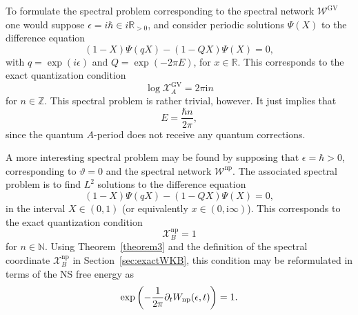 \documentclass[pdftex]{sigma}
\numberwithin{equation}{section}
\begin{document}
To formulate the spectral problem corresponding to the spectral network $\mathcal{W}^\mathrm{GV}$ one would suppose $\epsilon = i \hbar \in i \mathbb{R}_{>0}$, and consider periodic solutions $\Psi(X)$ to the difference equation
\begin{equation*}
 (1-X) \Psi(q X) - (1 - Q X) \Psi(X) =0,
\end{equation*}
with $q = \exp (i \epsilon)$ and $Q = \exp (-2 \pi E)$, for $x \in \mathbb{R}$. This corresponds to the exact quantization condition
\begin{equation*}
 \log \mathcal{X}_A^\mathrm{GV} = 2 \pi \mathrm{i} n
\end{equation*}
for $n \in \mathbb{Z}$. This spectral problem is rather trivial, however. It just implies that
\begin{equation*}
E = \frac{\hbar n}{2\pi},
\end{equation*}
since the quantum $A$-period does not receive any quantum corrections.

A more interesting spectral problem may be found by supposing that $\epsilon = \hbar >0$, corresponding to $\vartheta = 0$ and the spectral network $\mathcal{W}^\mathrm{np}$. The associated spectral problem is to find $L^2$ solutions to the difference equation
\begin{equation*}
 (1-X) \Psi(q X) - (1 - Q X) \Psi(X) =0,
\end{equation*}
in the interval $X \in (0,1)$ (or equivalently $x \in (0,\mathrm{i} \infty)$).
This corresponds to the exact quantization condition
\begin{equation*}
 \mathcal{X}_B^\mathrm{np} = 1
\end{equation*}
for $n \in \mathbb{N}$. Using Theorem~\ref{theorem3} and the definition of the spectral coordinate $\mathcal{X}_B^\mathrm{np}$ in Section~\ref{sec:exactWKB}, this condition may be reformulated in terms of the NS free energy as
\begin{equation*}
 \exp \left(-\frac{1}{2 \pi} \partial_t W_{\rm np} (\epsilon,t) \right) = 1.
\end{equation*}
\end{document}
